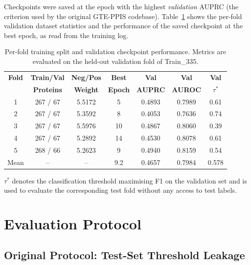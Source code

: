 \documentclass[11pt,a4paper]{article}
\begin{document}
Checkpoints were saved at the epoch with the highest \emph{validation} AUPRC
(the criterion used by the original GTE-PPIS codebase). Table~\ref{tab:valid}
shows the per-fold validation dataset statistics and the performance of the saved
checkpoint at the best epoch, as read from the training log.

\begin{table}[h]
\centering
\caption{Per-fold training split and validation checkpoint performance.
Metrics are evaluated on the held-out validation fold of Train\_335.}
\label{tab:valid}
\setlength{\tabcolsep}{5pt}
\begin{tabular}{ccccccc}
\toprule
\textbf{Fold} & \textbf{Train/Val} & \textbf{Neg/Pos} & \textbf{Best} & \textbf{Val}  & \textbf{Val}  & \textbf{Val} \\
              & \textbf{Proteins}  & \textbf{Weight}  & \textbf{Epoch}& \textbf{AUPRC}& \textbf{AUROC}& \textbf{$\tau^*$} \\
\midrule
1 & 267 / 67 & 5.5172 &  5 & 0.4893 & 0.7989 & 0.61 \\
2 & 267 / 67 & 5.3592 &  8 & 0.4053 & 0.7636 & 0.74 \\
3 & 267 / 67 & 5.5976 & 10 & 0.4867 & 0.8060 & 0.39 \\
4 & 267 / 67 & 5.2892 & 14 & 0.4530 & 0.8078 & 0.61 \\
5 & 268 / 66 & 5.2623 &  9 & 0.4940 & 0.8159 & 0.54 \\
\midrule
Mean & -- & -- & 9.2 & 0.4657 & 0.7984 & 0.578 \\
\bottomrule
\end{tabular}
\end{table}

$\tau^*$ denotes the classification threshold maximising F1 on the validation set
and is used to evaluate the corresponding test fold without any access to test labels.

\section{Evaluation Protocol}

\subsection{Original Protocol: Test-Set Threshold Leakage}
\label{sec:leak}
\end{document}
